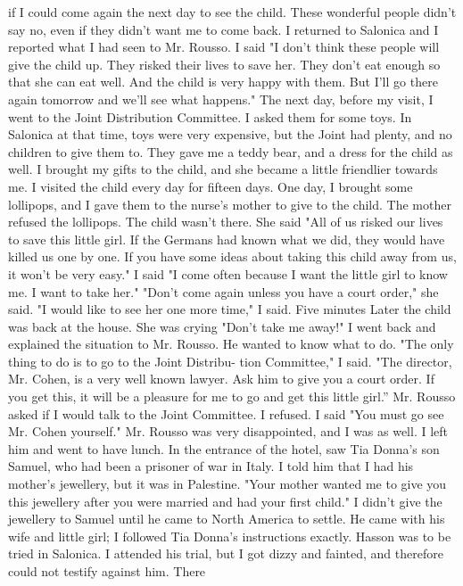 if I could come again the next day to see the child. These wonderful 
people didn't say no, even if they didn't want me to come back. 
I returned to Salonica and I reported what I had seen to Mr. Rousso. 
I said "I don't think these people will give the child up. They risked 
their lives to save her. They don't eat enough so that she can eat well. 
And the child is very happy with them. But I'll go there again tomorrow 
and we'll see what happens." 
The next day, before my visit, I went to the Joint Distribution 
Committee. I asked them for some toys. In Salonica at that time, toys 
were very expensive, but the Joint had plenty, and no children to give 
them to. They gave me a teddy bear, and a dress for the child as well. 
I brought my gifts to the child, and she became a little friendlier towards me. 
I visited the child every day for fifteen days. One day, I brought 
some lollipops, and I gave them to the nurse's mother to give to the 
child. The mother refused the lollipops. The child wasn't there. She 
said "All of us risked our lives to save this little girl. If the Germans had known what we did, they would have killed us one by one. If you 
have some ideas about taking this child away from us, it won't be very 
easy." 
I said "I come often because I want the little girl to know me. I 
want to take her." 
"Don't come again unless you have a court order," she said. 
"I would like to see her one more time," I said. Five minutes Later 
the child was back at the house. She was crying "Don't take me away!" 
I went back and explained the situation to Mr. Rousso. He wanted to 
know what to do. "The only thing to do is to go to the Joint Distribu-
tion Committee," I said. "The director, Mr. Cohen, is a very well known 
lawyer. Ask him to give you a court order. If you get this, it will be 
a pleasure for me to go and get this little girl.” Mr. Rousso asked
if I would talk to the Joint Committee. I refused. I said "You must 
go see Mr. Cohen yourself." Mr. Rousso was very disappointed, and I was 
as well. 
I left him and went to have lunch. In the entrance of the hotel, 
saw Tia Donna's son Samuel, who had been a prisoner of war in Italy. I 
told him that I had his mother's jewellery, but it was in Palestine. 
"Your mother wanted me to give you this jewellery after you were married 
and had your first child." I didn't give the jewellery to Samuel until 
he came to North America to settle. He came with his wife and little 
girl; I followed Tia Donna's instructions exactly. 
Hasson was to be tried in Salonica. I attended his trial, but I 
got dizzy and fainted, and therefore could not testify against him. There 
